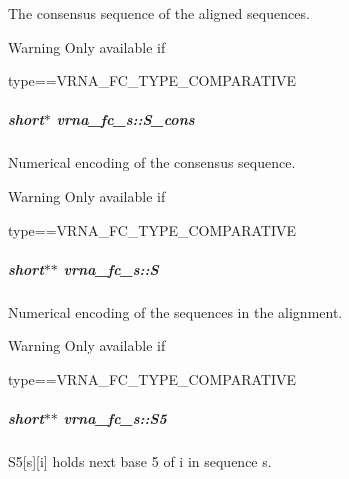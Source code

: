 The consensus sequence of the aligned sequences. 

\begin{DoxyWarning}{Warning}
Only available if\begin{DoxyVerb}type==VRNA_FC_TYPE_COMPARATIVE \end{DoxyVerb}
 
\end{DoxyWarning}
\subparagraph[{\texorpdfstring{S\+\_\+cons}{S_cons}}]{\setlength{\rightskip}{0pt plus 5cm}short$\ast$ vrna\+\_\+fc\+\_\+s\+::\+S\+\_\+cons}\hypertarget{group__fold__compound_aa3fab7ae38ebfed2028375221d295686}{}\label{group__fold__compound_aa3fab7ae38ebfed2028375221d295686}


Numerical encoding of the consensus sequence. 

\begin{DoxyWarning}{Warning}
Only available if\begin{DoxyVerb}type==VRNA_FC_TYPE_COMPARATIVE \end{DoxyVerb}
 
\end{DoxyWarning}
\subparagraph[{\texorpdfstring{S}{S}}]{\setlength{\rightskip}{0pt plus 5cm}short$\ast$$\ast$ vrna\+\_\+fc\+\_\+s\+::S}\hypertarget{group__fold__compound_aebb37297f92c7bd22aac6343f8f61d61}{}\label{group__fold__compound_aebb37297f92c7bd22aac6343f8f61d61}


Numerical encoding of the sequences in the alignment. 

\begin{DoxyWarning}{Warning}
Only available if\begin{DoxyVerb}type==VRNA_FC_TYPE_COMPARATIVE \end{DoxyVerb}
 
\end{DoxyWarning}
\subparagraph[{\texorpdfstring{S5}{S5}}]{\setlength{\rightskip}{0pt plus 5cm}short$\ast$$\ast$ vrna\+\_\+fc\+\_\+s\+::\+S5}\hypertarget{group__fold__compound_a78d089b475e2230bd536b9a6ed8bb17c}{}\label{group__fold__compound_a78d089b475e2230bd536b9a6ed8bb17c}


S5\mbox{[}s\mbox{]}\mbox{[}i\mbox{]} holds next base 5\textquotesingle{} of i in sequence s. 

